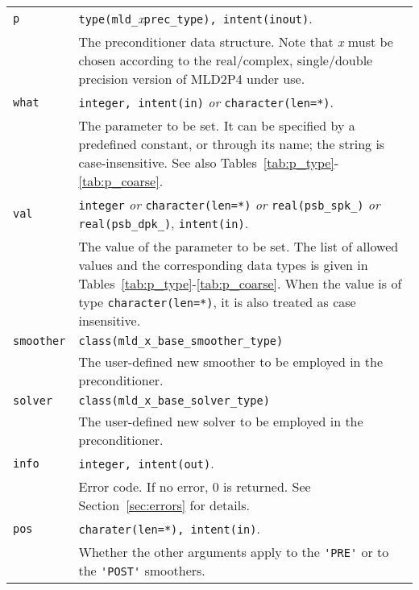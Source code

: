 \begin{tabular}{p{1.2cm}p{12cm}}
\verb|p|      & \verb|type(mld_|\emph{x}\verb|prec_type), intent(inout)|.\\
              & The preconditioner data structure. Note that \emph{x} must
                be chosen according to the real/complex, single/double precision
                 version of MLD2P4 under use.\\
\verb|what|   & \verb|integer, intent(in)| \emph{or} \verb|character(len=*)|. \\
              & The parameter to be set. It can be specified by 
                a predefined constant, or through its name; the string
                is case-insensitive. See also
                Tables~\ref{tab:p_type}-\ref{tab:p_coarse}.\\ 
\verb|val |   & \verb|integer| \emph{or} \verb|character(len=*)| \emph{or}
                \verb|real(psb_spk_)| \emph{or} \verb|real(psb_dpk_)|,
                \verb|intent(in)|.\\
              & The value of the parameter to be set. The list of allowed
                values and the corresponding data types is given in
                Tables~\ref{tab:p_type}-\ref{tab:p_coarse}.
                When the value is of type \verb|character(len=*)|,
                it is also treated as case insensitive.\\
\verb|smoother| & \verb|class(mld_x_base_smoother_type)| \\
              & The user-defined new smoother to be employed in the
                preconditioner.\\

\verb|solver| & \verb|class(mld_x_base_solver_type)| \\
              & The user-defined new solver to be employed in the
                preconditioner.\\

\verb|info|   & \verb|integer, intent(out)|.\\
              & Error code. If no error, 0 is returned. See Section~\ref{sec:errors}
                for details.\\
\verb|pos|   & \verb|charater(len=*), intent(in)|.\\
              & Whether the other arguments apply to the \verb|'PRE'|
                or to the \verb|'POST'| smoothers.\\

%
\end{tabular}

